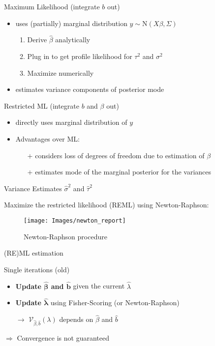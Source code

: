 \documentclass[12pt]{article}
\begin{document}
Maximum Likelihood (integrate $b$ out)

\begin{itemize}
\item uses (partially) marginal distribution $y \sim \mathrm{N}(X\beta,\Sigma)$

\begin{enumerate}
\item Derive $\hat{\beta}$ analytically
\item Plug in to get profile likelihood for $\tau^2$ and $\sigma^2$
\item Maximize numerically
\end{enumerate}

\item estimates variance components of posterior mode
\end{itemize}



Restricted ML (integrate $b$ and $\beta$ out)

\begin{itemize}
\item directly uses marginal distribution of $y$

\item Advantages over ML:
\begin{itemize}
\item[$+$] considers loss of degrees of freedom due to estimation of $\beta$ 
\item[$+$] estimates mode of the marginal posterior for the variances
\end{itemize}
\end{itemize}



Variance Estimates $\hat{\sigma}^2$ and $\hat{\tau}^2$

Maximize the restricted likelihood (REML) using Newton-Raphson:

\begin{figure}
\begin{center}
\texttt{[image: Images/newton\_report]}
\end{center}
\vspace{-2em}
\caption[caption]{Newton-Raphson procedure}\label{newton}
\end{figure}






(RE)ML estimation

Single iterations (old)
\begin{itemize}
\item \textbf{Update  $\boldsymbol{\hat{\beta}}$ and $\boldsymbol{\hat{b}}$} given the current $\hat{\lambda}$
\item \textbf{Update $\boldsymbol{\hat{\lambda}}$} using Fisher-Scoring (or Newton-Raphson)

$\rightarrow$ $\mathcal{V}_{\hat{\beta}, \hat{b}}(\lambda)$ depends on $\hat{\beta}$ and $\hat{b}$
\end{itemize}
$\Rightarrow$ Convergence is not guaranteed
\end{document}
